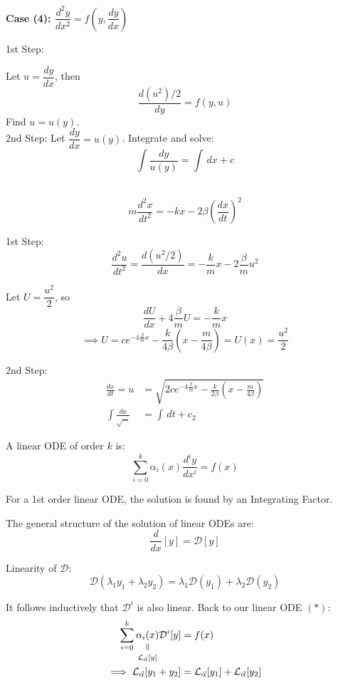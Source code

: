\documentclass[twoside]{scrartcl}
\begin{document}
\textbf{Case (4): $\dfrac{d^2y}{dx^2} = f\left(y,\dfrac{dy}{dx}\right)$}

1st Step: 

Let $u = \dfrac{dy}{dx}$, then 
\[\frac{d(u^2)/2}{dy} = f(y,u)\]
Find $u = u(y)$.\\

2nd Step:
Let $\dfrac{dy}{dx} = u(y)$. Integrate and solve:
\[\int \frac{dy}{u(y)} = \int\,dx + c\]~

\begin{example}[Spring]
	\[m\frac{d^2x}{dt^2} = -kx - 2\beta\left(\frac{dx}{dt}\right)^2\]
	
	1st Step: 
	\[\frac{d^2u}{dt^2} = \frac{d(u^2/2)}{dx} = -\frac{k}{m}x - 2\frac{\beta}{m}u^2\]
	
	Let $U = \dfrac{u^2}{2}$, so 
	\[\frac{dU}{dx} + 4\frac{\beta}{m}U = -\frac{k}{m}x\]
	\[\implies U = ce^{-4\frac{\beta}{m}x} - \frac{k}{4\beta}\left(x - \frac{m}{4\beta}\right) = U(x) = \frac{u^2}{2}\]

	2nd Step: 
	\[
\begin{aligned}
  \frac{dx}{dt} = u &= \sqrt{2ce^{-4\frac{\beta}{m}x} - \frac{k}{2\beta}\left(x-\frac{m}{4\beta}\right)}\\
  \int \frac{dx}{\sqrt{\dots}} &= \int \,dt + c_2
\end{aligned}
\]
\end{example}





A linear ODE of order $k$ is:
\[\sum_{i=0}^k \alpha_i(x) \frac{d^iy}{dx^i} = f(x) \tag{$*$}\]

For a 1st order linear ODE, the solution is found by an Integrating Factor. 

The general structure of the solution of linear ODEs are: 
\[\frac{d}{dx}[y] = \mathcal{D}[y]\]

Linearity of $\mathcal{D}$:
\[\mathcal{D}(\lambda_1y_1 + \lambda_2y_2) = \lambda_1\mathcal{D}(y_1) +\lambda_2\mathcal{D}(y_2)\]

It follows inductively that $\mathcal{D}^i$ is also linear. Back to our linear ODE $(*)$: 
\[
\begin{aligned}
  \sum_{i=0}^k \equalto{\alpha_i(x)}{\mathcal{L}_{\vec{\alpha}}[y]}\mathcal{D}^i[y] &= f(x)\\
  \implies \mathcal{L}_{\vec{\alpha}}[y_1 + y_2] &= \mathcal{L}_{\vec{\alpha}}[y_1] + \mathcal{L}_{\vec{\alpha}}[y_2]
\end{aligned}
\]
\end{document}
